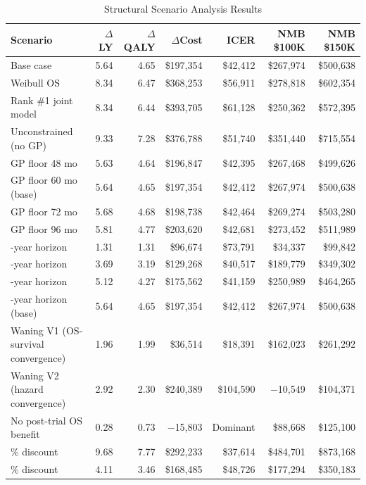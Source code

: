 \documentclass[11pt,a4paper]{article}
\begin{document}
\begin{landscape}
\begin{table}[p]
\centering
\caption{Structural Scenario Analysis Results}
\label{tab:s13}
\footnotesize
\setlength{\tabcolsep}{5pt}
\begin{tabularx}{\linewidth}{@{}>{\raggedright\arraybackslash}Xrrrrrr@{}}
\toprule
\textbf{Scenario} & \textbf{$\Delta$LY} & \textbf{$\Delta$QALY} & \textbf{$\Delta$Cost} & \textbf{ICER} & \textbf{NMB \$100K} & \textbf{NMB \$150K} \\
\midrule
Base case & 5.64 & 4.65 & \$197,354 & \$42,412 & \$267,974 & \$500,638 \\
Weibull OS & 8.34 & 6.47 & \$368,253 & \$56,911 & \$278,818 & \$602,354 \\
Rank \#1 joint model & 8.34 & 6.44 & \$393,705 & \$61,128 & \$250,362 & \$572,395 \\
Unconstrained (no GP) & 9.33 & 7.28 & \$376,788 & \$51,740 & \$351,440 & \$715,554 \\
GP floor 48 mo & 5.63 & 4.64 & \$196,847 & \$42,395 & \$267,468 & \$499,626 \\
GP floor 60 mo (base) & 5.64 & 4.65 & \$197,354 & \$42,412 & \$267,974 & \$500,638 \\
GP floor 72 mo & 5.68 & 4.68 & \$198,738 & \$42,464 & \$269,274 & \$503,280 \\
GP floor 96 mo & 5.81 & 4.77 & \$203,620 & \$42,681 & \$273,452 & \$511,989 \\
10-year horizon & 1.31 & 1.31 & \$96,674 & \$73,791 & \$34,337 & \$99,842 \\
20-year horizon & 3.69 & 3.19 & \$129,268 & \$40,517 & \$189,779 & \$349,302 \\
30-year horizon & 5.12 & 4.27 & \$175,562 & \$41,159 & \$250,989 & \$464,265 \\
40-year horizon (base) & 5.64 & 4.65 & \$197,354 & \$42,412 & \$267,974 & \$500,638 \\
Waning V1 (OS-survival convergence) & 1.96 & 1.99 & \$36,514 & \$18,391 & \$162,023 & \$261,292 \\
Waning V2 (hazard convergence) & 2.92 & 2.30 & \$240,389 & \$104,590 & $-$10,549 & \$104,371 \\
No post-trial OS benefit & 0.28 & 0.73 & $-$15,803 & Dominant & \$88,668 & \$125,100 \\
0\% discount & 9.68 & 7.77 & \$292,233 & \$37,614 & \$484,701 & \$873,168 \\
5\% discount & 4.11 & 3.46 & \$168,485 & \$48,726 & \$177,294 & \$350,183 \\
\bottomrule
\end{tabularx}
\end{table}
\end{landscape}
\end{document}
